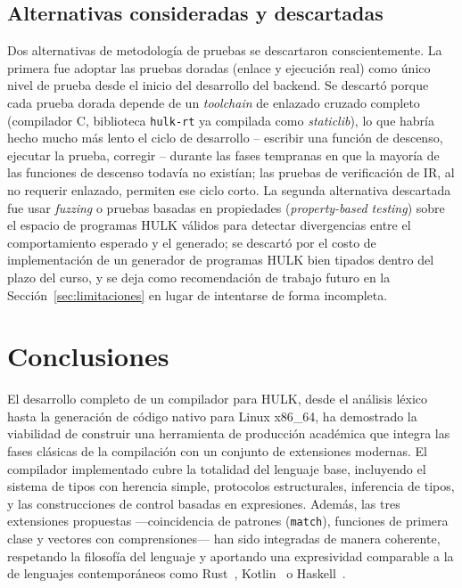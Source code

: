 \documentclass[12pt, a4paper]{article}
\begin{document}
\subsection{Alternativas consideradas y descartadas}

Dos alternativas de metodología de pruebas se descartaron conscientemente.
La primera fue adoptar las pruebas doradas (enlace y ejecución real) como
único nivel de prueba desde el inicio del desarrollo del backend. Se descartó
porque cada prueba dorada depende de un \textit{toolchain} de enlazado
cruzado completo (compilador C, biblioteca \texttt{hulk-rt} ya compilada como
\textit{staticlib}), lo que habría hecho mucho más lento el ciclo de
desarrollo -- escribir una función de descenso, ejecutar la prueba, corregir
-- durante las fases tempranas en que la mayoría de las funciones de descenso
todavía no existían; las pruebas de verificación de IR, al no requerir
enlazado, permiten ese ciclo corto. La segunda alternativa descartada fue usar
\textit{fuzzing} o pruebas basadas en propiedades (\textit{property-based
testing}) sobre el espacio de programas HULK válidos para detectar
divergencias entre el comportamiento esperado y el generado; se descartó por
el costo de implementación de un generador de programas HULK bien tipados
dentro del plazo del curso, y se deja como recomendación de trabajo futuro en
la Sección~\ref{sec:limitaciones} en lugar de intentarse de forma incompleta.


\section{Conclusiones}
\label{sec:conclusiones}

El desarrollo completo de un compilador para HULK, desde el análisis léxico hasta la generación de código nativo para Linux x86\_64, ha demostrado la viabilidad de construir una herramienta de producción académica que integra las fases clásicas de la compilación con un conjunto de extensiones modernas. El compilador implementado cubre la totalidad del lenguaje base, incluyendo el sistema de tipos con herencia simple, protocolos estructurales, inferencia de tipos, y las construcciones de control basadas en expresiones. Además, las tres extensiones propuestas —coincidencia de patrones (\texttt{match}), funciones de primera clase y vectores con comprensiones— han sido integradas de manera coherente, respetando la filosofía del lenguaje y aportando una expresividad comparable a la de lenguajes contemporáneos como Rust~\cite{klabnik2019}, Kotlin~\cite{jemerov2017} o Haskell~\cite{marlow2010}.
\end{document}
